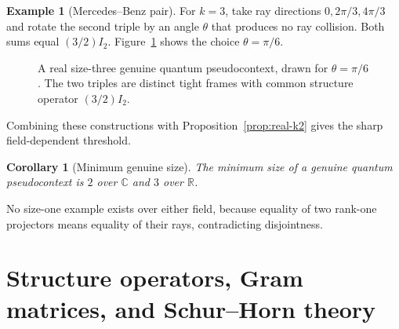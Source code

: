 \documentclass[
  twocolumn,
  aps,
  pra,
  floatfix,
  amsmath,amssymb,
  longbibliography
]{revtex4-2}
\newtheorem{corollary}[theorem]{Corollary}
\theoremstyle{definition}
\newtheorem{example}[theorem]{Example}
\theoremstyle{remark}
\newcommand{\R}{\mathbb R}
\newcommand{\C}{\mathbb C}
\newcommand{\1}{\mathbf 1}
\begin{document}
\begin{example}[Mercedes--Benz pair]
\label{ex:mercedes}
For $k=3$, take ray directions $0,2\pi/3,4\pi/3$ and rotate the second
triple by an angle $\theta$ that produces no ray collision.  Both sums equal
$(3/2)I_2$.  Figure~\ref{fig:mercedes} shows the choice $\theta=\pi/6$.
\end{example}

\begin{figure}[tb]
\centering
{}
\caption{\label{fig:mercedes}
A real size-three genuine quantum pseudocontext, drawn for
$\theta=\pi/6$.  The two triples are distinct tight frames with common
structure operator $(3/2)I_2$.}
\end{figure}

Combining these constructions with Proposition~\ref{prop:real-k2} gives the
sharp field-dependent threshold.

\begin{corollary}[Minimum genuine size]
\label{cor:threshold}
The minimum size of a genuine quantum pseudocontext is $2$ over $\C$ and $3$
over $\R$.
\end{corollary}

No size-one example exists over either field, because equality of two
rank-one projectors means equality of their rays, contradicting disjointness.

\section{Structure operators, Gram matrices, and Schur--Horn theory}
\label{sec:spectral}
\end{document}
